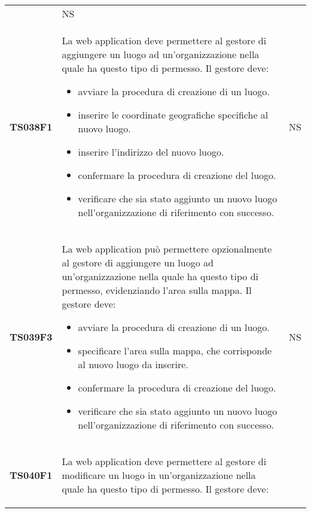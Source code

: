 \documentclass[../piano-di-qualifica.tex]{subfiles}
\begin{document}
\begin{centering}
\begin{longtable}[H]{>{\centering\bfseries}m{3cm} >{}p{10cm} >{\centering\arraybackslash}m{3cm}}
\begin{itemize}
                      \end{itemize}
                    & NS \\
        TS038F1     & La web application deve permettere al gestore di aggiungere un luogo ad un'organizzazione nella quale ha questo tipo di permesso. \newline
                      Il gestore deve:
                      \begin{itemize}
                        \item avviare la procedura di creazione di un luogo.
                        \item inserire le coordinate geografiche specifiche al nuovo luogo.
                        \item inserire l'indirizzo del nuovo luogo.
                        \item confermare la procedura di creazione del luogo.
                        \item verificare che sia stato aggiunto un nuovo luogo nell'organizzazione di riferimento con successo.
                      \end{itemize}
                    & NS \\
        TS039F3     & La web application può permettere opzionalmente al gestore di aggiungere un luogo ad un'organizzazione nella quale ha questo tipo di permesso, evidenziando l'area sulla mappa. \newline
                      Il gestore deve:
                      \begin{itemize}
                        \item avviare la procedura di creazione di un luogo.
                        \item specificare l'area sulla mappa, che corrisponde al nuovo luogo da inserire.
                        \item confermare la procedura di creazione del luogo.
                        \item verificare che sia stato aggiunto un nuovo luogo nell'organizzazione di riferimento con successo.
                      \end{itemize}
                    & NS \\
        TS040F1     & La web application deve permettere al gestore di modificare un luogo in un'organizzazione nella quale ha questo tipo di permesso. \newline
                      Il gestore deve:
                      \begin{itemize}

\end{itemize}
\end{longtable}
\end{centering}
\end{document}
